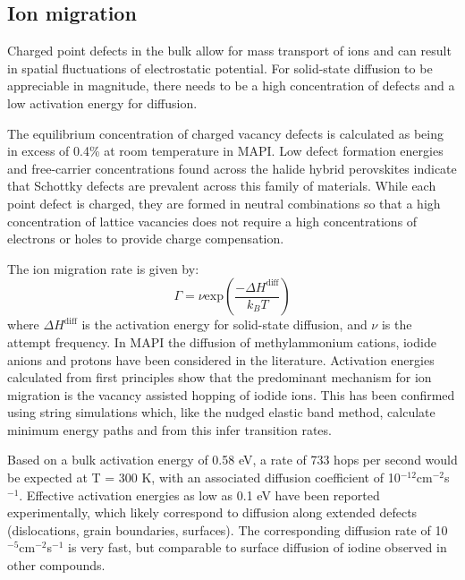 \subsection{Ion migration} 

Charged point defects in the bulk allow for mass transport of ions and can result in spatial fluctuations of electrostatic potential.
For solid-state diffusion to be appreciable in magnitude, there needs to be a high concentration of defects and a low activation energy for diffusion. 

The equilibrium concentration of charged vacancy defects is calculated as being in excess of 0.4\% at room temperature in MAPI.\autocite{Walsh2015}
Low defect formation energies and free-carrier concentrations found across the halide hybrid perovskites indicate that Schottky defects are prevalent across this family of materials.
While each point defect is charged, they are formed in neutral combinations so that a high concentration of lattice vacancies does not require a high concentrations of electrons or holes to provide charge compensation. 

The ion migration rate is given by:
%
\begin{equation}
\Gamma = \nu \textrm{exp} \left( \frac{-\Delta H^\textrm{diff}}{k_BT} \right)
\end{equation}
%
where $\Delta H^\textrm{diff}$ is the activation energy for solid-state diffusion,
and $\nu$ is the attempt frequency. 
In MAPI the diffusion of methylammonium cations, iodide anions and protons have been considered in the literature. 
Activation energies calculated from first principles show that the predominant mechanism for ion migration is the vacancy assisted hopping of iodide ions.\autocite{Eames2015a}
This has been confirmed using string simulations\autocite{Meloni2016a} which, like the nudged elastic band method, calculate minimum energy paths and from this infer transition rates.

Based on a bulk activation energy of 0.58 eV\autocite{Eames2015a}, a rate of 733 hops per second would be expected at T = 300 K, with an associated diffusion coefficient of 10$^{-12}$cm$^{-2}$s$^{-1}$.
Effective activation energies as low as 0.1 eV have been reported experimentally,\autocite{Bryant2015,Game2017} which likely 
correspond to diffusion along extended defects (dislocations, grain boundaries, surfaces)\autocite{Shao2016a,Yun2016}.
The corresponding diffusion rate of 10$^{-5}$cm$^{-2}$s$^{-1}$ is very fast, but comparable to surface 
diffusion of iodine observed in other compounds.\autocite{Chandra1980}

